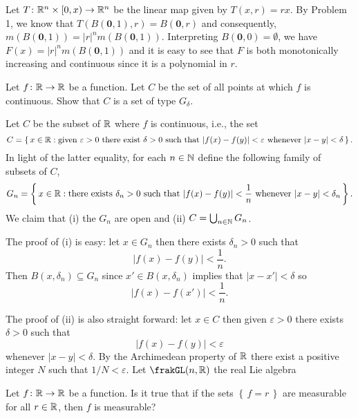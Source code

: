 \begin{solution}
  Let \(T\colon\mathbb{R}^n\times[0,x)\to\mathbb{R}^n\) be the linear map given by
  \(T(x,r)=rx\). By Problem 1, we know that
  \(T(B(\mathbf{0},1),r)=B(\mathbf{0},r)\) and consequently,
  \(m(B(\mathbf{0},1))=|r|^nm(B(\mathbf{0},1))\). Interpreting
  \(B(\mathbf{0},0)=\emptyset\), we have \(F(x)=|r|^nm(B(\mathbf{0},1))\)
  and it is easy to see that \(F\) is both monotonically increasing and
  continuous since it is a polynomial in \(r\).
\end{solution}

\begin{problem}
  Let \(f\colon\mathbb{R}\to\mathbb{R}\) be a function. Let \(C\) be the set of all
  points at which \(f\) is continuous. Show that \(C\) is a set of type
  \(G_\delta\).
\end{problem}
\begin{solution}
  Let \(C\) be the subset of \(\mathbb{R}\) where \(f\) is continuous, i.e., the
  set
  \[
    C=\left\{\,x\in\mathbb{R}:\text{given \(\varepsilon>0\) there exist
        \(\delta>0\) such that \(|f(x)-f(y)|<\varepsilon\) whenever
      \(|x-y|<\delta\)}\,\right\}.
  \]
  In light of the latter equality, for each \(n\in\mathbb{N}\) define the
  following family of subsets of \(C\),
  \[
    G_n=\left\{\,x\in\mathbb{R}:\text{there exists \(\delta_n>0\) such that
        \(|f(x)-f(y)|<\frac{1}{n}\) whenever \(|x-y|<\delta_n\)}\,\right\}.
  \]
  We claim that (i) the \(G_n\) are open and (ii)
  \(C=\bigcup_{n\in\mathbb{N}}G_n\).

  The proof of (i) is easy: let \(x\in G_n\) then there exists
  \(\delta_n>0\) such that
  \[
    |f(x)-f(y)|<\frac{1}{n}.
  \]
  Then $B(x,\delta_n)\subseteq G_n$ since \(x'\in B(x,\delta_n)\) implies
  that \(|x-x'|<\delta\) so
  \[
    |f(x)-f(x')|<\frac{1}{n}.
  \]

  The proof of (ii) is also straight forward: let \(x\in C\) then given
  \(\varepsilon>0\) there exists \(\delta>0\) such that
  \[
    |f(x)-f(y)|<\varepsilon
  \]
  whenever \(|x-y|<\delta\). By the Archimedean property of \(\mathbb{R}\) there
  exist a positive integer \(N\) such that \(1/N<\varepsilon\). Let
  $\frakGL(n,\bbR)$ the real Lie algebra
\end{solution}

\begin{problem}
  Let \(f\colon\mathbb{R}\to\mathbb{R}\) be a function. Is it true that if the sets
  \(\left\{\,f=r\,\right\}\) are measurable for all \(r\in\mathbb{R}\), then
  \(f\) is measurable?
\end{problem}
\begin{solution}
\end{solution}

